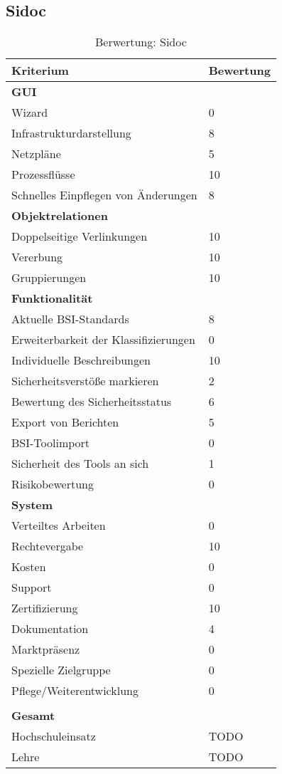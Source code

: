 \subsection{Sidoc}
\begin{table}[h!bt]
\begin{tabular}{|p{}|p{}|}
\hline 
Kriterium & Bewertung\\ 
\hline 
\textbf{GUI}& \\
\hline
Wizard & 0\\
\hline 
Infrastrukturdarstellung & 8 \\
\hline 
Netzpläne & 5 \\
\hline 
Prozessflüsse & 10 \\
\hline 
Schnelles Einpflegen von Änderungen & 8 \\
\hline
\textbf{Objektrelationen} & \\
\hline 
Doppelseitige Verlinkungen & 10 \\
\hline 
Vererbung & 10 \\
\hline 
Gruppierungen & 10 \\
\hline 
\textbf{Funktionalität} &\\
\hline 
Aktuelle BSI-Standards & 8 \\
\hline  
Erweiterbarkeit der Klassifizierungen & 0 \\
\hline 
Individuelle Beschreibungen & 10 \\
\hline 
Sicherheitsverstöße markieren & 2 \\
\hline
Bewertung des Sicherheitsstatus & 6 \\
\hline
Export von Berichten & 5 \\
\hline
BSI-Toolimport & 0 \\
\hline
Sicherheit des Tools an sich & 1 \\
\hline
Risikobewertung & 0 \\
\hline
\textbf{System}&  \\
\hline
Verteiltes Arbeiten & 0 \\
\hline
Rechtevergabe & 10 \\
\hline
Kosten & 0 \\
\hline
Support & 0 \\
\hline
Zertifizierung & 10 \\
\hline
Dokumentation & 4 \\
\hline
Marktpräsenz & 0 \\
\hline
Spezielle Zielgruppe & 0 \\
\hline
Pflege/Weiterentwicklung & 0 \\
\hline
\multicolumn{2}{c}{}\\
\hline
\textbf{Gesamt} & \\
\hline
Hochschuleinsatz & TODO\\
\hline
Lehre & TODO\\
\hline
\end{tabular} 
\caption{Berwertung: Sidoc}
\label{tab:BerwertungSidoc}
\end{table}